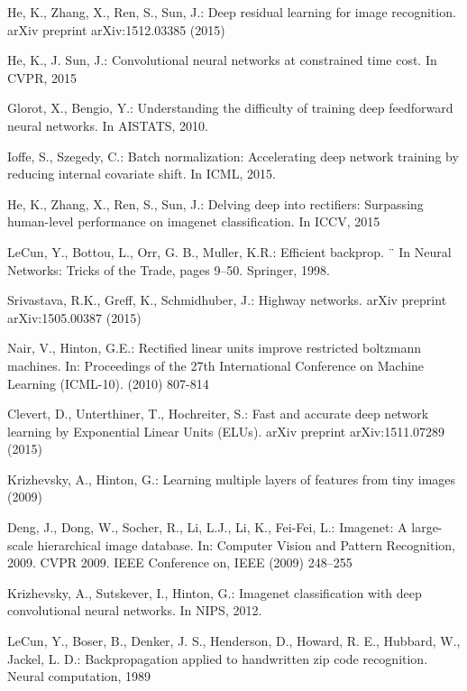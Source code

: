 \documentclass[10pt,twocolumn,letterpaper]{article}
\begin{document}
{\small

\begin{thebibliography}{9}

\bibitem{[1]}
He, K., Zhang, X., Ren, S., Sun, J.: Deep residual learning for image recognition.  arXiv preprint arXiv:1512.03385 (2015)

\bibitem{[2]}
He, K., J. Sun, J.: Convolutional neural networks at constrained time
cost. In CVPR, 2015

\bibitem{[3]}
Glorot, X., Bengio, Y.: Understanding the difficulty of training
deep feedforward neural networks. In AISTATS, 2010.
 
\bibitem{[4]}
Ioffe, S., Szegedy, C.: Batch normalization: Accelerating deep
network training by reducing internal covariate shift. In ICML, 2015.

\bibitem{[5]}
He, K., Zhang, X., Ren, S., Sun, J.: Delving deep into rectifiers:
Surpassing human-level performance on imagenet classification. In
ICCV, 2015

\bibitem{[6]}
LeCun, Y., Bottou, L., Orr, G. B., Muller, K.R.: Efficient backprop. ¨
In Neural Networks: Tricks of the Trade, pages 9–50. Springer, 1998.

\bibitem{[7]}
Srivastava, R.K., Greff, K., Schmidhuber, J.: Highway networks. arXiv
preprint arXiv:1505.00387 (2015)

\bibitem{[8]}
Nair, V., Hinton, G.E.: Rectified linear units improve restricted boltzmann
machines. In: Proceedings of the 27th International Conference on Machine
Learning (ICML-10). (2010) 807-814

\bibitem{[9]}
Clevert, D., Unterthiner, T., Hochreiter, S.: Fast and accurate deep network 
learning by Exponential Linear Units (ELUs). arXiv preprint arXiv:1511.07289 (2015)

\bibitem{[10]}
Krizhevsky, A., Hinton, G.: Learning multiple layers of features from tiny
images (2009)

\bibitem{[11]}
Deng, J., Dong, W., Socher, R., Li, L.J., Li, K., Fei-Fei, L.: Imagenet: A
large-scale hierarchical image database. In: Computer Vision and Pattern
Recognition, 2009. CVPR 2009. IEEE Conference on, IEEE (2009) 248–255

\bibitem{[12]}
Krizhevsky, A., Sutskever, I., Hinton, G.: Imagenet classification
with deep convolutional neural networks. In NIPS, 2012.

\bibitem{[13]}
LeCun, Y., Boser, B., Denker, J. S., Henderson, D., Howard, R. E.,
Hubbard, W., Jackel, L. D.: Backpropagation applied to handwritten
zip code recognition. Neural computation, 1989


\end{thebibliography}}
\end{document}
